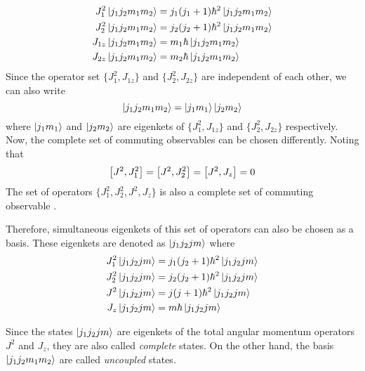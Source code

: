 \begin{align}
\label{chapter19-eqn4}
\begin{split}
J_1^2 \ket{j_1 j_2 m_1 m_2} &= j_1(j_1+1)\hbar^2 \ket{j_1 j_2 m_1 m_2} \\
J_2^2 \ket{j_1 j_2 m_1 m_2} &= j_2(j_2+1)\hbar^2 \ket{j_1 j_2 m_1 m_2} \\
J_{1 z} \ket{j_1 j_2 m_1 m_2} &= m_1 \hbar \ket{j_1 j_2 m_1 m_2} \\
J_{2 z} \ket{j_1 j_2 m_1 m_2} &= m_2 \hbar \ket{j_1 j_2 m_1 m_2}
\end{split}
\end{align}
Since the operator set $\{J_1^2, J_{1 z}\}$ and $\{J_2^2, J_{2 z}\}$ are independent of each other, we can also write
\begin{equation}
	\ket{j_1 j_2 m_1 m_2} = \ket{j_1 m_1} \ket{j_2 m_2}
\end{equation}
where $\ket{j_1 m_1}$ and $\ket{j_2 m_2}$ are eigenkets of $\{J_1^2, J_{1 z} \}$ and $\{J_2^2, J_{2 z} \}$ respectively.\\


Now, the complete set of commuting observables can be chosen differently. Noting that 
\begin{equation}
\comm{J^2}{J_1^2} = \comm{J^2}{J_2^2} = \comm{J^2}{J_z} =0
\end{equation}
The set of operators $\{J_1^2, J_2^2, J^2, J_z\}$ is also a complete set of commuting observable  .

Therefore, simultaneous eigenkets of this set of operators can also be chosen as a basis. These eigenkets are denoted as $\ket{j_1 j_2 j m}$ where
\begin{align}
\label{chapter19-eqn5}
\begin{split}
J_1^2 \ket{j_1 j_2 j m} &= j_1(j_2 + 1) \hbar^2 \ket{j_1 j_2 j m} \\
J_2^2 \ket{j_1 j_2 j m} &= j_2(j_2 + 1) \hbar^2 \ket{j_1 j_2 j m} \\
J^2 \ket{j_1 j_2 j m} &= j(j + 1) \hbar^2 \ket{j_1 j_2 j m} \\
J_z \ket{j_1 j_2 j m} &= m\hbar  \ket{j_1 j_2 j m}
\end{split}
\end{align}

Since the states $\ket{j_1 j_2 j m}$ are eigenkets of the total angular momentum operators $J^2$ and $J_z$, they are also called \textit{complete} states. On the other hand, the basis $\ket{j_1 j_2 m_1 m_2}$ are called \textit{uncoupled} states.

